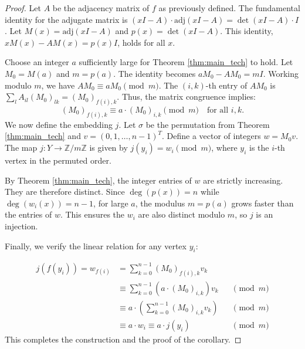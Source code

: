 \begin{proof}
Let $A$ be the adjacency matrix of $f$ as previously defined. The fundamental identity for the adjugate matrix is $(xI - A) \cdot \text{adj}(xI - A) = \det(xI - A) \cdot I$. Let $M(x) = \text{adj}(xI - A)$ and $p(x) = \det(xI - A)$. This identity, $xM(x) - AM(x) = p(x)I$, holds for all $x$.

Choose an integer $a$ sufficiently large for Theorem \ref{thm:main_tech} to hold. Let $M_0 = M(a)$ and $m = p(a)$. The identity becomes $aM_0 - AM_0 = mI$. Working modulo $m$, we have $AM_0 \equiv aM_0 \pmod{m}$. The $(i, k)$-th entry of $AM_0$ is $\sum_{l} A_{il} (M_0)_{lk} = (M_0)_{f(i), k}$. Thus, the matrix congruence implies:
\[
(M_0)_{f(i), k} \equiv a \cdot (M_0)_{i, k} \pmod{m} \quad \text{for all } i, k.
\]
We now define the embedding $j$. Let $\sigma$ be the permutation from Theorem \ref{thm:main_tech} and $v=(0, 1, \dots, n-1)^T$. Define a vector of integers $w = M_0 v$. The map $j: Y \to \mathbb{Z}/m\mathbb{Z}$ is given by $j(y_i) = w_i \pmod m$, where $y_i$ is the $i$-th vertex in the permuted order.

By Theorem \ref{thm:main_tech}, the integer entries of $w$ are strictly increasing. They are therefore distinct. Since $\deg(p(x))=n$ while $\deg(w_i(x)) = n-1$, for large $a$, the modulus $m=p(a)$ grows faster than the entries of $w$. This ensures the $w_i$ are also distinct modulo $m$, so $j$ is an injection.

Finally, we verify the linear relation for any vertex $y_i$:

\begin{align*}
j(f(y_i)) = w_{f(i)} &= \sum_{k=0}^{n-1} (M_0)_{f(i), k} v_k \\
&\equiv \sum_{k=0}^{n-1} \left(a \cdot (M_0)_{i, k}\right) v_k &&\pmod{m} \\
&\equiv a \cdot \left(\sum_{k=0}^{n-1} (M_0)_{i, k} v_k\right) &&\pmod{m} \\
&\equiv a \cdot w_i \equiv a \cdot j(y_i) &&\pmod{m}
\end{align*}
This completes the construction and the proof of the corollary.
\end{proof}
